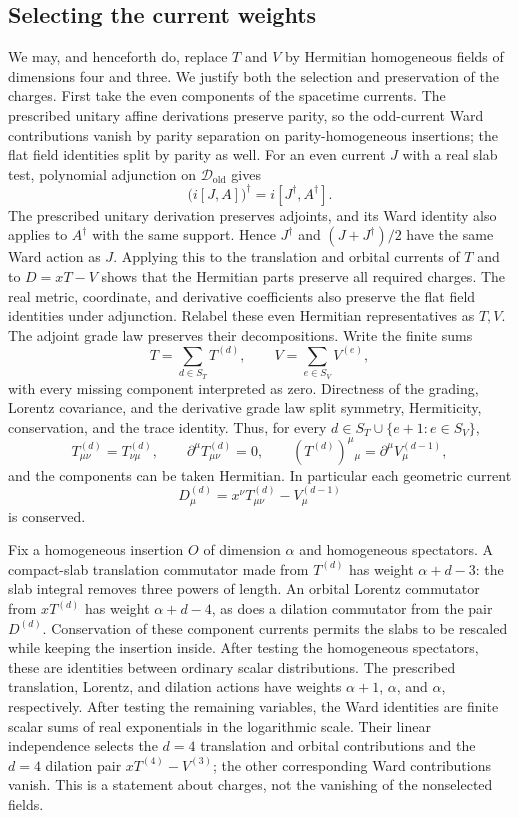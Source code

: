 \subsection{Selecting the current weights}
\label{F:weights}

We may, and henceforth do, replace $T$ and $V$ by Hermitian homogeneous
fields of dimensions four and three. We justify both the selection and
preservation of the charges. First take the even components of the
spacetime currents. The prescribed unitary affine derivations preserve
parity, so the odd-current Ward contributions vanish by parity separation
on parity-homogeneous insertions; the flat field identities split by parity as
well. For an even current $J$ with a real slab test, polynomial adjunction
on $\mathcal D_{\mathrm{old}}$ gives
\[
 \bigl(i[J,A]\bigr)^\dagger=i[J^\dagger,A^\dagger].
\]
The prescribed unitary derivation preserves adjoints, and its Ward identity
also applies to $A^\dagger$ with the same support. Hence $J^\dagger$ and
$(J+J^\dagger)/2$ have the same Ward action as $J$. Applying this to the
translation and orbital currents of $T$ and to $D=xT-V$ shows that the
Hermitian parts preserve all required charges. The real metric, coordinate,
and derivative coefficients also preserve the flat field identities under
adjunction. Relabel these even Hermitian representatives as $T,V$.
The adjoint grade law preserves their decompositions. Write the finite sums
\[
 T=\sum_{d\in S_T}T^{(d)},\qquad
 V=\sum_{e\in S_V}V^{(e)},
\]
with every missing component interpreted as zero. Directness of the grading,
Lorentz covariance, and the derivative grade law split symmetry,
Hermiticity, conservation, and the trace identity. Thus, for every
$d\in S_T\cup\{e+1:e\in S_V\}$,
\[
 T^{(d)}_{\mu\nu}=T^{(d)}_{\nu\mu},\qquad
 \partial^\mu T^{(d)}_{\mu\nu}=0,\qquad
 (T^{(d)})^\mu{}_{\mu}=\partial^\mu V^{(d-1)}_\mu,
\]
and the components can be taken Hermitian. In particular each geometric
current
\[
 D^{(d)}_\mu=x^\nu T^{(d)}_{\mu\nu}-V^{(d-1)}_\mu
\]
is conserved.

Fix a homogeneous insertion $O$ of dimension $\alpha$ and homogeneous
spectators. A compact-slab translation commutator made from $T^{(d)}$ has
weight $\alpha+d-3$: the slab integral removes three powers of length.
An orbital Lorentz commutator from $xT^{(d)}$ has weight $\alpha+d-4$,
as does a dilation commutator from the pair $D^{(d)}$. Conservation of
these component currents permits the slabs to be rescaled while keeping
the insertion inside. After testing the homogeneous spectators, these are
identities between ordinary scalar distributions. The prescribed
translation, Lorentz, and dilation actions have weights $\alpha+1$,
$\alpha$, and $\alpha$, respectively. After testing the remaining variables,
the Ward identities are finite scalar sums of real exponentials in the
logarithmic scale. Their linear independence
selects the $d=4$ translation and orbital contributions and the $d=4$
dilation pair $xT^{(4)}-V^{(3)}$; the other corresponding Ward
contributions vanish. This is a statement about charges, not the vanishing
of the nonselected fields.

